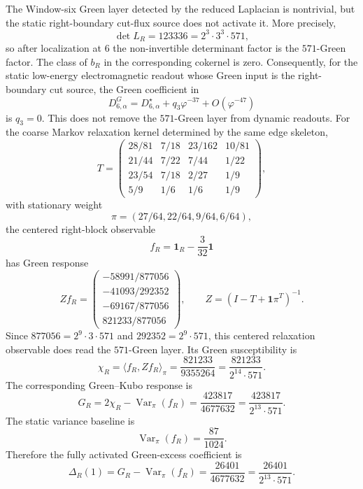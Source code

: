 \begin{theorem}
\label{thm:zeckendorf-static-right-boundary-source-green-zero}
The Window-six Green layer detected by the reduced Laplacian is
nontrivial, but the static right-boundary cut-flux source does not
activate it. More precisely,
$$
  \det L_R
  =
  123336
  =
  2^3\cdot3^3\cdot571,
$$
so after localization at $6$ the non-invertible determinant factor is the
$571$-Green factor. The class of $b_R$ in the corresponding cokernel is
zero. Consequently, for the static low-energy electromagnetic readout
whose Green input is the right-boundary cut source, the Green coefficient
in
$$
  D_{6,\alpha}^{G}
  =
  D_{6,\alpha}^{\star}
  +
  q_3\varphi^{-37}
  +
  O(\varphi^{-47})
$$
is $q_3=0$. This does not remove the $571$-Green layer from dynamic
readouts. For the coarse Markov relaxation kernel determined by the same
edge skeleton,
$$
  T
  =
  \begin{pmatrix}
  28/81&7/18&23/162&10/81\\
  21/44&7/22&7/44&1/22\\
  23/54&7/18&2/27&1/9\\
  5/9&1/6&1/6&1/9
  \end{pmatrix},
$$
with stationary weight
$$
  \pi=(27/64,22/64,9/64,6/64),
$$
the centered right-block observable
$$
  f_R=\mathbf{1}_R-\frac{3}{32}\mathbf{1}
$$
has Green response
$$
  Zf_R
  =
  \begin{pmatrix}
  -58991/877056\\
  -41093/292352\\
  -69167/877056\\
  821233/877056
  \end{pmatrix},
  \qquad
  Z=(I-T+\mathbf{1}\pi^T)^{-1}.
$$
Since $877056=2^9\cdot3\cdot571$ and
$292352=2^9\cdot571$, this centered relaxation observable does read the
$571$-Green layer. Its Green susceptibility is
$$
  \chi_R
  =
  \langle f_R,Zf_R\rangle_\pi
  =
  \frac{821233}{9355264}
  =
  \frac{821233}{2^{14}\cdot571}.
$$
The corresponding Green--Kubo response is
$$
  G_R
  =
  2\chi_R-\operatorname{Var}_\pi(f_R)
  =
  \frac{423817}{4677632}
  =
  \frac{423817}{2^{13}\cdot571}.
$$
The static variance baseline is
$$
  \operatorname{Var}_\pi(f_R)
  =
  \frac{87}{1024}.
$$
Therefore the fully activated Green-excess coefficient is
$$
  \Delta_R(1)
  =
  G_R-\operatorname{Var}_\pi(f_R)
  =
  \frac{26401}{4677632}
  =
  \frac{26401}{2^{13}\cdot571}.
$$
\end{theorem}
